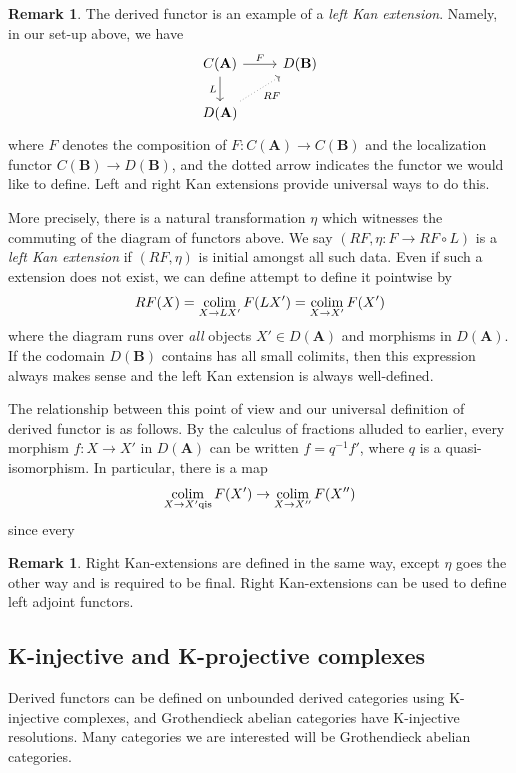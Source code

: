 \documentclass[10pt]{article}
\theoremstyle{definition}
\newtheorem{rmk}[thm]{Remark}
\newcommand{\colim}{\operatornamewithlimits{colim}}
\newcommand{\cat}{\mathbf}
\begin{document}
\begin{rmk}
The derived functor is an example of a \emph{left Kan extension}.  Namely, in our set-up above, we have
$$\begin{tikzcd}
C(\cat{A}) \arrow[r, "F"] \arrow[d, "L"'] & D(\cat{B}) \\
D(\cat{A}) \arrow[ur, dotted, "RF"'] &
\end{tikzcd}$$
where $F$ denotes the composition of $F: C(\cat{A}) \rightarrow C(\cat{B})$ and the localization functor $C(\cat{B}) \rightarrow D(\cat{B})$, and the dotted arrow indicates the functor we would like to define.  Left and right Kan extensions provide universal ways to do this.

More precisely, there is a natural transformation $\eta$ which witnesses the commuting of the diagram of functors above.  We say $(RF, \eta: F \rightarrow RF \circ L)$ is a \emph{left Kan extension} if $(RF, \eta)$ is initial amongst all such data.  Even if such a extension does not exist, we can define attempt to define it pointwise by
$$RF(X) = \colim_{X \rightarrow LX'} F(LX') = \colim_{X \rightarrow X'} F(X')$$
where the diagram runs over \emph{all} objects $X' \in D(\cat{A})$ and morphisms in $D(\cat{A})$.  If the codomain $D(\cat{B})$ contains has all small colimits, then this expression always makes sense and the left Kan extension is always well-defined.


The relationship between this point of view and our universal definition of derived functor is as follows.  By the calculus of fractions alluded to earlier, every morphism $f: X \rightarrow X'$ in $D(\cat{A})$ can be written $f = q^{-1}f'$, where $q$ is a quasi-isomorphism.  In particular, there is a map
$$\colim_{X \rightarrow X' \mathrm{qis}} F(X') \rightarrow \colim_{X \rightarrow X''} F(X'')$$
since every 
\end{rmk}


\begin{rmk}
Right Kan-extensions are defined in the same way, except $\eta$ goes the other way and is required to be final.  Right Kan-extensions can be used to define left adjoint functors.  
\end{rmk}

\subsection{K-injective and K-projective complexes}

Derived functors can be defined on unbounded derived categories using K-injective complexes, and Grothendieck abelian categories have K-injective resolutions.  Many categories we are interested will be Grothendieck abelian categories.
\end{document}
